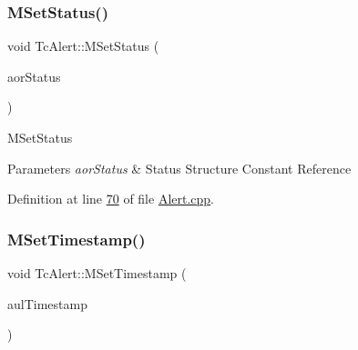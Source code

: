 \mbox{\label{class_g_n_common_1_1_n_notification_1_1_tc_alert_a682a17a50fc2c50bfb92ec3eeafdb5c9}} 
\subsubsection{\texorpdfstring{M\+Set\+Status()}{MSetStatus()}}
{\footnotesize\ttfamily void Tc\+Alert\+::\+M\+Set\+Status (\begin{DoxyParamCaption}\item[{const \mbox{\hyperlink{class_g_n_common_1_1_n_notification_1_1_tc_status}{Tc\+Status}} \&}]{aor\+Status }\end{DoxyParamCaption})}

M\+Set\+Status 
\begin{DoxyParams}{Parameters}
{\em aor\+Status} & Status Structure Constant Reference \\
\hline
\end{DoxyParams}


Definition at line \mbox{\hyperlink{_alert_8cpp_source_l00070}{70}} of file \mbox{\hyperlink{_alert_8cpp_source}{Alert.\+cpp}}.

\mbox{\label{class_g_n_common_1_1_n_notification_1_1_tc_alert_ac6ed25087bcdbb12921d71c2c4126131}} 
\subsubsection{\texorpdfstring{M\+Set\+Timestamp()}{MSetTimestamp()}}
{\footnotesize\ttfamily void Tc\+Alert\+::\+M\+Set\+Timestamp (\begin{DoxyParamCaption}\item[{const \mbox{\hyperlink{namespace_g_n_common_a9404ee6090c788ae70aebd1436ceb97d}{Tu64}}}]{aul\+Timestamp }\end{DoxyParamCaption})}

